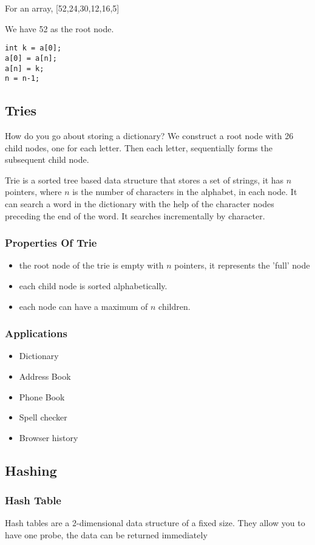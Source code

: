 \documentclass[11pt]{article}
\begin{document}
For an array, [52,24,30,12,16,5]

We have 52 as the root node.

\begin{verbatim}
int k = a[0];
a[0] = a[n];
a[n] = k;
n = n-1;
\end{verbatim}
\subsection{Tries}
\label{sec:org56c4899}
How do you go about storing a dictionary? We construct a root node with 26 child nodes, one for each letter. Then each letter, sequentially forms the subsequent child node.

Trie is a sorted tree based data structure that stores a set of strings, it has \(n\) pointers, where \(n\) is the number of characters in the alphabet, in each node. It can search a word in the dictionary with the help of the character nodes preceding the end of the word. It searches incrementally by character.
\subsubsection{Properties Of Trie}
\label{sec:org97fff9c}
\begin{itemize}
\item the root node of the trie is empty with \(n\) pointers, it represents the 'full' node
\item each child node is sorted alphabetically.
\item each node can have a maximum of \(n\) children.
\end{itemize}
\subsubsection{Applications}
\label{sec:org118f415}
\begin{itemize}
\item Dictionary
\item Address Book
\item Phone Book
\item Spell checker
\item Browser history
\end{itemize}
\subsection{Hashing}
\label{sec:orgcd9ef53}
\subsubsection{Hash Table}
\label{sec:orga49b155}
Hash tables are a 2-dimensional data structure of a fixed size. They allow you to have one probe, the data can be returned immediately
\end{document}
